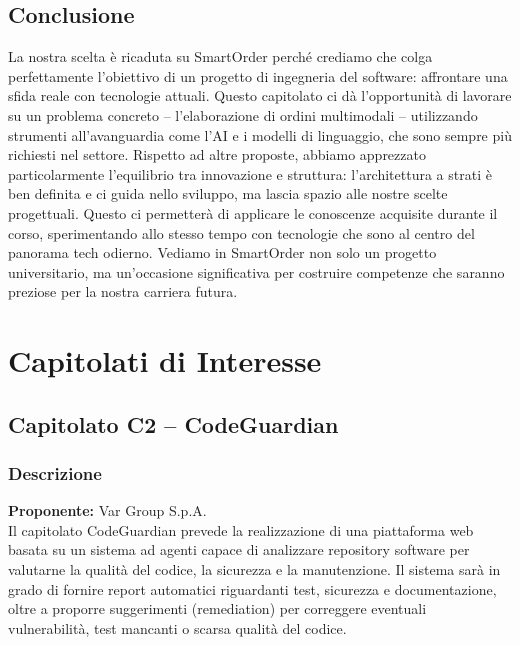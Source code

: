 \documentclass{article}
\begin{document}
	\subsection{Conclusione}
	La nostra scelta è ricaduta su SmartOrder perché crediamo che colga perfettamente l'obiettivo di un progetto di ingegneria del software: affrontare una sfida reale con tecnologie attuali. Questo capitolato ci dà l'opportunità di lavorare su un problema concreto – l'elaborazione di ordini multimodali – utilizzando strumenti all'avanguardia come l'AI e i modelli di linguaggio, che sono sempre più richiesti nel settore.
    Rispetto ad altre proposte, abbiamo apprezzato particolarmente l'equilibrio tra innovazione e struttura: l'architettura a strati è ben definita e ci guida nello sviluppo, ma lascia spazio alle nostre scelte progettuali. Questo ci permetterà di applicare le conoscenze acquisite durante il corso, sperimentando allo stesso tempo con tecnologie che sono al centro del panorama tech odierno.
    Vediamo in SmartOrder non solo un progetto universitario, ma un'occasione significativa per costruire competenze che saranno preziose per la nostra carriera futura.

	
	\section{Capitolati di Interesse}
	\subsection{Capitolato C2 – CodeGuardian}
	\subsubsection{Descrizione}
    \textbf{Proponente:} Var Group S.p.A.\\
	Il capitolato CodeGuardian prevede la realizzazione di una piattaforma web basata su un sistema ad agenti capace di analizzare repository software per valutarne la qualità del codice, la sicurezza e la manutenzione. Il sistema sarà in grado di fornire report automatici riguardanti test, sicurezza e documentazione, oltre a proporre suggerimenti (remediation) per correggere eventuali vulnerabilità, test mancanti o scarsa qualità del codice.
	
\end{document}

